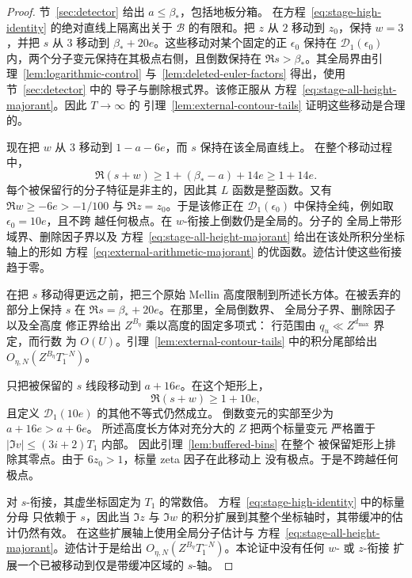 \begin{proof}

节~\ref{sec:detector} 给出 $a\le\beta_*$，包括地板分箱。
在方程~\eqref{eq:stage-high-identity} 的绝对直线上隔离出关于 $\mathcal B$
的有限和。把
$z$ 从 $2$ 移动到 $z_0$，保持 $w=3$，并把 $s$ 从 $3$ 移动到
$\beta_*+20e$。这些移动对某个固定的正 $\epsilon_0$ 保持在 $\mathcal D_1(\epsilon_0)$
内，两个分子变元保持在其极点右侧，且倒数保持在
$\Re s>\beta_*$。其全局界由引理~\ref{lem:logarithmic-control}
与~\ref{lem:deleted-euler-factors} 得出，使用节~\ref{sec:detector} 中的
导子与删除根式界。该修正服从
方程~\eqref{eq:stage-all-height-majorant}。因此 $T\to\infty$ 的
引理~\ref{lem:external-contour-tails} 证明这些移动是合理的。

现在把 $w$ 从 $3$ 移动到 $1-a-6e$，而 $s$ 保持在该全局直线上。
在整个移动过程中，
\[
 \Re(s+w)\ge1+(\beta_*-a)+14e\ge1+14e.
\]
每个被保留行的分子特征是非主的，因此其
$L$ 函数是整函数。又有 $\Re w\ge-6e>-1/100$ 与
$\Re z=z_0$。于是该修正在
$\mathcal D_1(\epsilon_0)$ 中保持全纯，例如取 $\epsilon_0=10e$，且不跨
越任何极点。在 $w$-衔接上倒数仍是全局的。分子的
全局上带形域界、删除因子界以及
方程~\eqref{eq:stage-all-height-majorant} 给出在该处所积分坐标轴上的形如
方程~\eqref{eq:external-arithmetic-majorant} 的优函数。迹估计使这些衔接趋于零。

在把 $s$ 移动得更远之前，把三个原始 Mellin 高度限制到所述长方体。在被丢弃的
部分上保持 $s$ 在 $\Re s=\beta_*+20e$。在那里，全局倒数界、
全局分子界、删除因子以及全高度
修正界给出 $Z^{B_\eta}$ 乘以高度的固定多项式：
行范围由 $q_u\ll Z^{d_{\max}}$ 界定，而行数
为 $O(U)$。引理~\ref{lem:external-contour-tails} 中的积分尾部给出
$O_{\eta,N}(Z^{B_\eta}T_1^{-N})$。

只把被保留的 $s$ 线段移动到 $a+16e$。在这个矩形上，
\[
 \Re(s+w)\ge1+10e,
\]
且定义 $\mathcal D_1(10e)$ 的其他不等式仍然成立。
倒数变元的实部至少为 $a+16e>a+6e$。
所述高度长方体对充分大的 $Z$ 把两个标量变元
严格置于 $|\Im v|\le(3i+2)T_1$ 内部。
因此引理~\ref{lem:buffered-bins} 在整个
被保留矩形上排除其零点。由于 $6z_0>1$，标量 zeta 因子在此移动上
没有极点。于是不跨越任何极点。

对 $s$-衔接，其虚坐标固定为 $T_1$ 的常数倍。
方程~\eqref{eq:stage-high-identity} 中的标量分母
只依赖于 $s$，因此当
$\Im z$ 与 $\Im w$ 的积分扩展到其整个坐标轴时，其带缓冲的估计仍然有效。
在这些扩展轴上使用全局分子估计与
方程~\eqref{eq:stage-all-height-majorant}。迹估计于是给出
$O_{\eta,N}(Z^{B_\eta}T_1^{-N})$。本论证中没有任何 $w$- 或 $z$-衔接
扩展一个已被移动到仅是带缓冲区域的 $s$-轴。

\end{proof}

